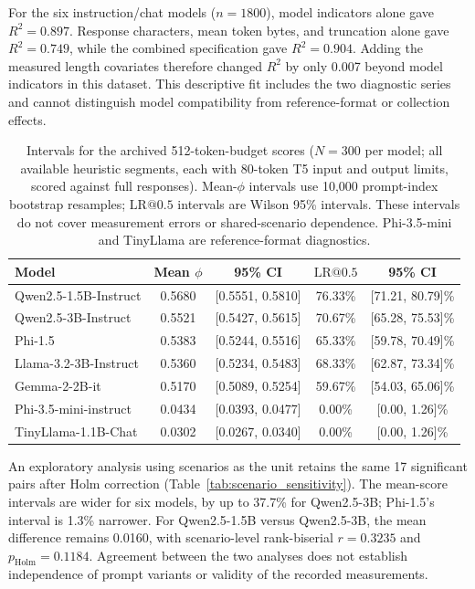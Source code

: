 \documentclass[electronics,article,submit,pdftex,moreauthors]{Definitions/mdpi}
\begin{document}
For the six instruction/chat models ($n=1800$), model indicators alone gave $R^2=0.897$. Response characters, mean token bytes, and truncation alone gave $R^2=0.749$, while the combined specification gave $R^2=0.904$. Adding the measured length covariates therefore changed $R^2$ by only 0.007 beyond model indicators in this dataset. This descriptive fit includes the two diagnostic series and cannot distinguish model compatibility from reference-format or collection effects.

\begin{table}[ht]
\centering
\caption{Intervals for the archived 512-token-budget scores ($N=300$ per model; all available heuristic segments, each with 80-token T5 input and output limits, scored against full responses). Mean-$\phi$ intervals use 10,000 prompt-index bootstrap resamples; $\mathrm{LR}@0.5$ intervals are Wilson 95\% intervals. These intervals do not cover measurement errors or shared-scenario dependence. Phi-3.5-mini and TinyLlama are reference-format diagnostics.}
\label{tab:statistical_results}
\begin{tabular}{l c c c c}
\toprule
Model & Mean $\phi$ & 95\% CI & $\mathrm{LR}@0.5$ & 95\% CI \\
\midrule
Qwen2.5-1.5B-Instruct & 0.5680 & [0.5551, 0.5810] & 76.33\% & [71.21, 80.79]\% \\
Qwen2.5-3B-Instruct & 0.5521 & [0.5427, 0.5615] & 70.67\% & [65.28, 75.53]\% \\
Phi-1.5 & 0.5383 & [0.5244, 0.5516] & 65.33\% & [59.78, 70.49]\% \\
Llama-3.2-3B-Instruct & 0.5360 & [0.5234, 0.5483] & 68.33\% & [62.87, 73.34]\% \\
Gemma-2-2B-it & 0.5170 & [0.5089, 0.5254] & 59.67\% & [54.03, 65.06]\% \\
Phi-3.5-mini-instruct & 0.0434 & [0.0393, 0.0477] & 0.00\% & [0.00, 1.26]\% \\
TinyLlama-1.1B-Chat & 0.0302 & [0.0267, 0.0340] & 0.00\% & [0.00, 1.26]\% \\
\bottomrule
\end{tabular}
\end{table}

An exploratory analysis using scenarios as the unit retains the same 17 significant pairs after Holm correction (Table~\ref{tab:scenario_sensitivity}). The mean-score intervals are wider for six models, by up to 37.7\% for Qwen2.5-3B; Phi-1.5's interval is 1.3\% narrower. For Qwen2.5-1.5B versus Qwen2.5-3B, the mean difference remains 0.0160, with scenario-level rank-biserial $r=0.3235$ and $p_{\mathrm{Holm}}=0.1184$. Agreement between the two analyses does not establish independence of prompt variants or validity of the recorded measurements.
\end{document}
